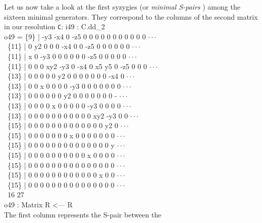 Let us now take a look at the first syzygies 
(or {\it minimal S-pairs} \cite[\S 2.9]{CLO1})
among  the sixteen minimal generators.
They correspond to the columns of the second matrix in our resolution {\tt C}:
\beginOutput
i49 : C.dd_2\\
\emptyLine
o49 = \{9\}  | -y3 -x4 0   -z5 0   0   0   0   0   0   0   0   0   0   0 $\cdot\cdot\cdot$\\
\      \{11\} | 0   y2  0   0   0   -x4 0   0   -z5 0   0   0   0   0   0 $\cdot\cdot\cdot$\\
\      \{11\} | x   0   -y3 0   0   0   0   0   0   -z5 0   0   0   0   0 $\cdot\cdot\cdot$\\
\      \{11\} | 0   0   0   xy2 -y3 0   -x4 0   x5  y5  0   -z5 0   0   0 $\cdot\cdot\cdot$\\
\      \{13\} | 0   0   0   0   0   y2  0   0   0   0   0   0   0   -x4 0 $\cdot\cdot\cdot$\\
\      \{13\} | 0   0   x   0   0   0   0   -y3 0   0   0   0   0   0   0 $\cdot\cdot\cdot$\\
\      \{13\} | 0   0   0   0   0   0   y2  0   0   0   0   0   0   0   - $\cdot\cdot\cdot$\\
\      \{13\} | 0   0   0   0   x   0   0   0   0   0   -y3 0   0   0   0 $\cdot\cdot\cdot$\\
\      \{13\} | 0   0   0   0   0   0   0   0   0   0   0   xy2 -y3 0   0 $\cdot\cdot\cdot$\\
\      \{15\} | 0   0   0   0   0   0   0   0   0   0   0   0   0   y2  0 $\cdot\cdot\cdot$\\
\      \{15\} | 0   0   0   0   0   0   0   x   0   0   0   0   0   0   0 $\cdot\cdot\cdot$\\
\      \{15\} | 0   0   0   0   0   0   0   0   0   0   0   0   0   0   y $\cdot\cdot\cdot$\\
\      \{15\} | 0   0   0   0   0   0   0   0   0   0   x   0   0   0   0 $\cdot\cdot\cdot$\\
\      \{15\} | 0   0   0   0   0   0   0   0   0   0   0   0   0   0   0 $\cdot\cdot\cdot$\\
\      \{15\} | 0   0   0   0   0   0   0   0   0   0   0   0   x   0   0 $\cdot\cdot\cdot$\\
\      \{15\} | 0   0   0   0   0   0   0   0   0   0   0   0   0   0   0 $\cdot\cdot\cdot$\\
\emptyLine
\              16       27\\
o49 : Matrix R   <--- R\\
\endOutput
The first column represents the S-pair between the
